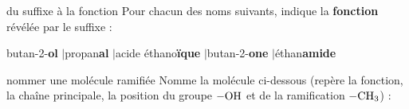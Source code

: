 \documentclass[11pt,a4paper]{article}
\begin{document}
\begin{exo}{du suffixe à la fonction}
Pour chacun des noms suivants, indique la \textbf{fonction} révélée par le suffixe :
\begin{center}\small
butan-2-\textbf{ol} \quad$\vert$\quad propan\textbf{al} \quad$\vert$\quad acide éthano\textbf{ïque} \quad$\vert$\quad butan-2-\textbf{one} \quad$\vert$\quad éthan\textbf{amide}
\end{center}
\end{exo}

\begin{exo}{nommer une molécule ramifiée}
Nomme la molécule ci-dessous (repère la fonction, la chaîne principale, la position du groupe $\ce{-OH}$ et de la ramification $\ce{-CH3}$) :
\begin{center}\end{center}
\end{exo}
\end{document}
